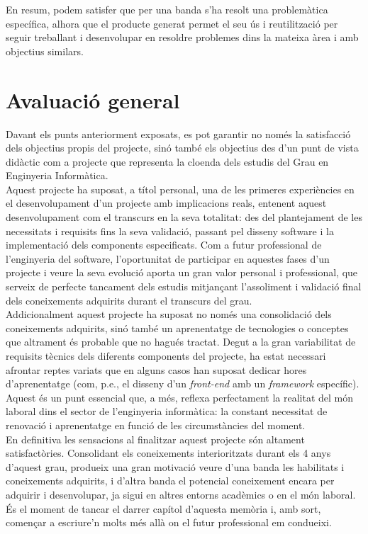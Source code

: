 En resum, podem satisfer que per una banda s'ha resolt una problemàtica específica, alhora que el producte generat permet el seu ús i reutilització per seguir treballant i desenvolupar en resoldre problemes dins la mateixa àrea i amb objectius similars.

\section{Avaluació general}

Davant els punts anteriorment exposats, es pot garantir no només la satisfacció dels objectius propis del projecte, sinó també els objectius des d'un punt de vista didàctic com a projecte que representa la cloenda dels estudis del Grau en Enginyeria Informàtica.\\

Aquest projecte ha suposat, a títol personal, una de les primeres experiències en el desenvolupament d'un projecte amb implicacions reals, entenent aquest desenvolupament com el transcurs en la seva totalitat: des del plantejament de les necessitats i requisits fins la seva validació, passant pel disseny software i la implementació dels components especificats. Com a futur professional de l'enginyeria del software, l'oportunitat de participar en aquestes fases d'un projecte i veure la seva evolució aporta un gran valor personal i professional, que serveix de perfecte tancament dels estudis mitjançant l'assoliment i validació final dels coneixements adquirits durant el transcurs del grau.\\

Addicionalment aquest projecte ha suposat no només una consolidació dels coneixements adquirits, sinó també un aprenentatge de tecnologies o conceptes que altrament és probable que no hagués tractat. Degut a la gran variabilitat de requisits tècnics dels diferents components del projecte, ha estat necessari afrontar reptes variats que en alguns casos han suposat dedicar hores d'aprenentatge (com, p.e., el disseny d'un \textit{front-end} amb un \textit{framework} específic). Aquest és un punt essencial que, a més, reflexa perfectament la realitat del món laboral dins el sector de l'enginyeria informàtica: la constant necessitat de renovació i aprenentatge en funció de les circumstàncies del moment.\\

En definitiva les sensacions al finalitzar aquest projecte són altament satisfactòries. Consolidant els coneixements interioritzats durant els 4 anys d'aquest grau, produeix una gran motivació veure d'una banda les habilitats i coneixements adquirits, i d'altra banda el potencial coneixement encara per adquirir i desenvolupar, ja sigui en altres entorns acadèmics o en el món laboral. És el moment de tancar el darrer capítol d'aquesta memòria i, amb sort, començar a escriure'n molts més allà on el futur professional em condueixi. \\